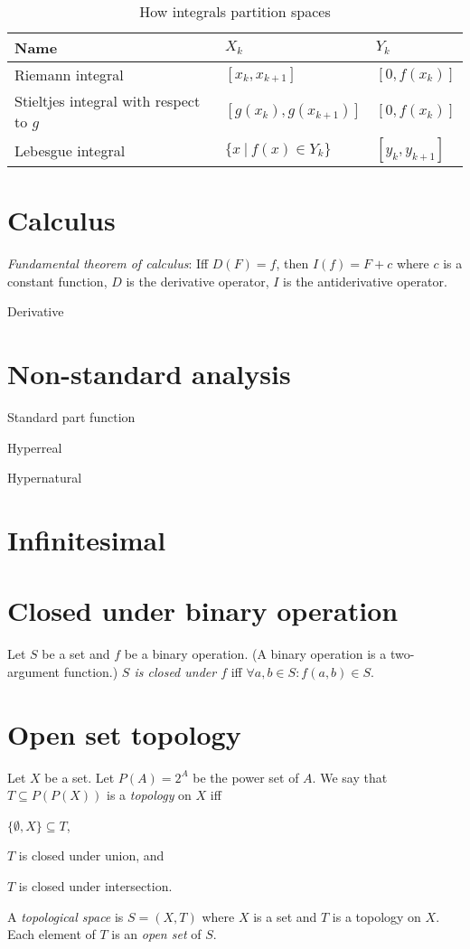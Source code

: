 \begin{table}[h]
    \caption{How integrals partition spaces}
    \label{tab:integral}
    \centering
\begin{tabular}{lll}
    Name & \(X_k\) & \(Y_k\)
    \\
    \hline
    Riemann integral & \( [x_k,x_{k+1}]\) & \( [0,f(x_k)]\)
    \\
    Stieltjes integral with respect to \(g\) & \( [g(x_k),g(x_{k+1})]\) & \( [0,f(x_k)]\)
    \\
    Lebesgue integral & \( \{x ~|~ f(x) \in Y_k\}\) & \( [y_k,y_{k+1}]\)
\end{tabular}
\end{table}

\section{Calculus}

%
\emph{Fundamental theorem of calculus}:
Iff \(D(F) = f\), then \(I(f) = F + c\) where \(c\) is a constant function,
\(D\) is the derivative operator, \(I\) is the antiderivative operator.

Derivative

\section{Non-standard analysis}

Standard part function

Hyperreal

Hypernatural

\section{Infinitesimal}

\section{Closed under binary operation}

%
Let \(S\) be a set and \(f\) be a binary operation.
(A binary operation is a two-argument function.)
\emph{\(S\) is closed under \(f\)} iff
\(\forall a, b \in S : f(a,b) \in S\).

\section{Open set topology}

Let \(X\) be a set.
Let \(P(A) = 2^A\) be the power set of \(A\).
We say that \(T \subseteq P(P(X))\) is a \emph{topology} on \(X\) iff
\begin{enumerate*}[label={(\arabic*)}]
    \item \(\{ \emptyset, X \} \subseteq T\),
    \item \(T\) is closed under union, and
    \item \(T\) is closed under intersection.
\end{enumerate*}

A \emph{topological space} is \(S = (X,T)\) where \(X\) is a set and \(T\) is a topology on \(X\).
Each element of \(T\) is an \emph{open set} of \(S\).
